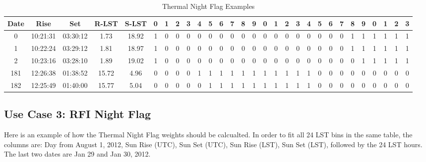 \documentclass{article}
\begin{document}
\begin{table}
{\tiny
\caption{Thermal Night Flag Examples \label{tab:time}}
\begin{tabular*}{1.05\textwidth}{@{\extracolsep{\fill}}ccccccccccccccccccccccccccccc}
\hline \hline
{\bf Date} & {\bf Rise} & {\bf Set} & {\bf R-LST} & {\bf S-LST} & {\bf 0} & {\bf 1} & {\bf 2} & {\bf 3} & {\bf 4} & {\bf 5} & {\bf 6} & {\bf 7} & {\bf 8} & {\bf 9} & {\bf 0} & {\bf 1} & {\bf 2} & {\bf 3} & {\bf 4} & {\bf 5} & {\bf 6} & {\bf 7} & {\bf 8} & {\bf 9} & {\bf 0} & {\bf 1} & {\bf 2} & {\bf 3}\\
\hline
0 & 10:21:31 & 03:30:12 & 1.73 & 18.92 & 1 & 0 & 0 & 0 & 0 & 0 & 0 & 0 & 0 & 0 & 0 & 0 & 0 & 0 & 0 & 0 & 0 & 0 & 1 & 1 & 1 & 1 & 1 & 1\\
1 & 10:22:24 & 03:29:12 & 1.81 & 18.97 & 1 & 0 & 0 & 0 & 0 & 0 & 0 & 0 & 0 & 0 & 0 & 0 & 0 & 0 & 0 & 0 & 0 & 0 & 1 & 1 & 1 & 1 & 1 & 1\\
2 & 10:23:16 & 03:28:10 & 1.89 & 19.02 & 1 & 0 & 0 & 0 & 0 & 0 & 0 & 0 & 0 & 0 & 0 & 0 & 0 & 0 & 0 & 0 & 0 & 0 & 0 & 1 & 1 & 1 & 1 & 1\\
181 & 12:26:38 & 01:38:52 & 15.72 & 4.96 & 0 & 0 & 0 & 0 & 1 & 1 & 1 & 1 & 1 & 1 & 1 & 1 & 1 & 1 & 1 & 0 & 0 & 0 & 0 & 0 & 0 & 0 & 0 & 0\\
182 & 12:25:49 & 01:40:00 & 15.77 & 5.04 & 0 & 0 & 0 & 0 & 0 & 1 & 1 & 1 & 1 & 1 & 1 & 1 & 1 & 1 & 1 & 0 & 0 & 0 & 0 & 0 & 0 & 0 & 0 & 0\\



\hline \hline
\end{tabular*}
}
\end{table}


\subsection{Use Case 3: RFI Night Flag}
Here is an example of how the Thermal Night Flag weights should be calcualted.  In order to fit all 24 LST bins in the same table, the columns are: Day from August 1, 2012, Sun Rise (UTC), Sun Set (UTC), Sun Rise (LST), Sun Set (LST), followed by the 24 LST hours.   The last two dates are Jan 29 and Jan 30, 2012.
\end{document}
